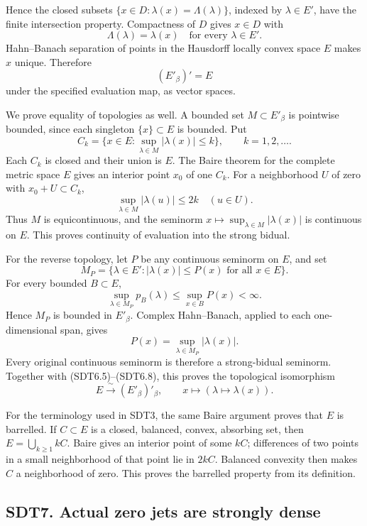 Hence the closed subsets \(\{x\in D:\lambda(x)=\Lambda(\lambda)\}\),
indexed by \(\lambda\in E'\), have the finite intersection property.
Compactness of \(D\) gives \(x\in D\) with \[
\Lambda(\lambda)=\lambda(x)\quad\text{for every }\lambda\in E'.
\tag{SDT6.5}
\] Hahn--Banach separation of points in the Hausdorff locally convex
space \(E\) makes \(x\) unique. Therefore \[
(E'_\beta)'=E
\tag{SDT6.6}
\] under the specified evaluation map, as vector spaces.

We prove equality of topologies as well. A bounded set
\(M\subset E'_\beta\) is pointwise bounded, since each singleton
\(\{x\}\subset E\) is bounded. Put \[
C_k=\{x\in E:\sup_{\lambda\in M}|\lambda(x)|\le k\},
\qquad k=1,2,\ldots.
\tag{SDT6.7}
\] Each \(C_k\) is closed and their union is \(E\). The Baire theorem
for the complete metric space \(E\) gives an interior point \(x_0\) of
one \(C_k\). For a neighborhood \(U\) of zero with \(x_0+U\subset C_k\),
\[
\sup_{\lambda\in M}|\lambda(u)|\le2k\quad(u\in U).
\tag{SDT6.8}
\] Thus \(M\) is equicontinuous, and the seminorm
\(x\mapsto\sup_{\lambda\in M}|\lambda(x)|\) is continuous on \(E\). This
proves continuity of evaluation into the strong bidual.

For the reverse topology, let \(P\) be any continuous seminorm on \(E\),
and set \[
M_P=\{\lambda\in E':|\lambda(x)|\le P(x)\text{ for all }x\in E\}.
\tag{SDT6.9}
\] For every bounded \(B\subset E\), \[
\sup_{\lambda\in M_P}p_B(\lambda)\le\sup_{x\in B}P(x)<\infty.
\] Hence \(M_P\) is bounded in \(E'_\beta\). Complex Hahn--Banach,
applied to each one-dimensional span, gives \[
P(x)=\sup_{\lambda\in M_P}|\lambda(x)|.
\tag{SDT6.10}
\] Every original continuous seminorm is therefore a strong-bidual
seminorm. Together with (SDT6.5)--(SDT6.8), this proves the topological
isomorphism \[
\boxed{E\xrightarrow{\ \sim\ }(E'_\beta)'_\beta,\qquad
x\longmapsto(\lambda\mapsto\lambda(x)).}
\tag{SDT6.11}
\]

For the terminology used in SDT3, the same Baire argument proves that
\(E\) is barrelled. If \(C\subset E\) is a closed, balanced, convex,
absorbing set, then \(E=\bigcup_{k\ge1}kC\). Baire gives an interior
point of some \(kC\); differences of two points in a small neighborhood
of that point lie in \(2kC\). Balanced convexity then makes \(C\) a
neighborhood of zero. This proves the barrelled property from its
definition.

\subsection{SDT7. Actual zero jets are strongly
dense}\label{sdt7.-actual-zero-jets-are-strongly-dense}

